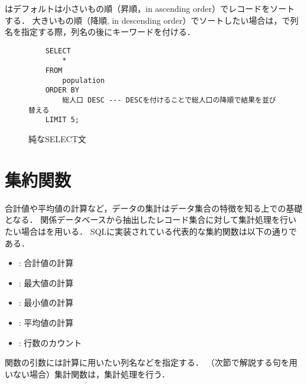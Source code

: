 はデフォルトは小さいもの順（昇順，in ascending order）でレコードをソートする．
大きいもの順（降順, in descending order）でソートしたい場合は，で列名を指定する際，列名の後にキーワードを付ける．
\begin{figure}[tb]
    \begin{verbatim}
    SELECT
        *
    FROM
        population
    ORDER BY
        総人口 DESC --- DESCを付けることで総人口の降順で結果を並び替える
    LIMIT 5;
    \end{verbatim}
    \captionsetup{name=コード}
    \caption{純なSELECT文}
    \label{code:sql-where3}
\end{figure}
\begin{table}[tb]
    \centering
    \caption{}
    \label{tb:}
\end{table}

\section{集約関数}
合計値や平均値の計算など，データの集計はデータ集合の特徴を知る上での基礎となる．
関係データベースから抽出したレコード集合に対して集計処理を行いたい場合はを用いる．
SQLに実装されている代表的な集約関数は以下の通りである．

\begin{itemize}
\item {}: 合計値の計算
\item {}: 最大値の計算
\item {}: 最小値の計算
\item {}: 平均値の計算
\item {}: 行数のカウント
\end{itemize}
関数の引数には計算に用いたい列名などを指定する．
（次節で解説する句を用いない場合）集計関数は，集計処理を行う．


